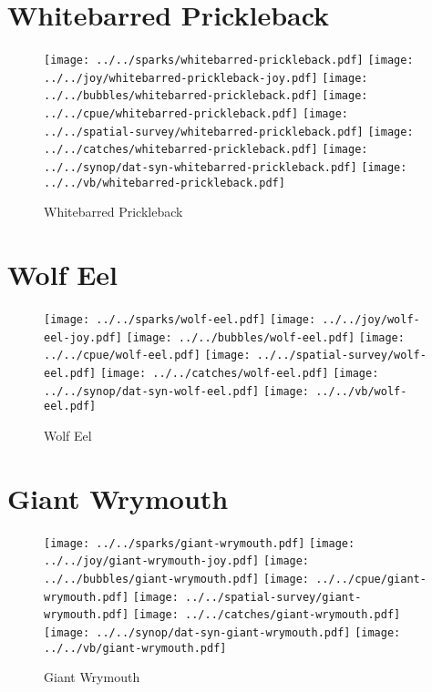 \section{Whitebarred Prickleback}

\begin{figure}[htbp]
\centering
\texttt{[image: ../../sparks/whitebarred-prickleback.pdf]}
\texttt{[image: ../../joy/whitebarred-prickleback-joy.pdf]}
\texttt{[image: ../../bubbles/whitebarred-prickleback.pdf]}
\texttt{[image: ../../cpue/whitebarred-prickleback.pdf]}
\texttt{[image: ../../spatial-survey/whitebarred-prickleback.pdf]}
\texttt{[image: ../../catches/whitebarred-prickleback.pdf]}
\texttt{[image: ../../synop/dat-syn-whitebarred-prickleback.pdf]}
\texttt{[image: ../../vb/whitebarred-prickleback.pdf]}
\caption{Whitebarred Prickleback}
\end{figure}
\clearpage
\section{Wolf Eel}

\begin{figure}[htbp]
\centering
\texttt{[image: ../../sparks/wolf-eel.pdf]}
\texttt{[image: ../../joy/wolf-eel-joy.pdf]}
\texttt{[image: ../../bubbles/wolf-eel.pdf]}
\texttt{[image: ../../cpue/wolf-eel.pdf]}
\texttt{[image: ../../spatial-survey/wolf-eel.pdf]}
\texttt{[image: ../../catches/wolf-eel.pdf]}
\texttt{[image: ../../synop/dat-syn-wolf-eel.pdf]}
\texttt{[image: ../../vb/wolf-eel.pdf]}
\caption{Wolf Eel}
\end{figure}
\clearpage
\section{Giant Wrymouth}

\begin{figure}[htbp]
\centering
\texttt{[image: ../../sparks/giant-wrymouth.pdf]}
\texttt{[image: ../../joy/giant-wrymouth-joy.pdf]}
\texttt{[image: ../../bubbles/giant-wrymouth.pdf]}
\texttt{[image: ../../cpue/giant-wrymouth.pdf]}
\texttt{[image: ../../spatial-survey/giant-wrymouth.pdf]}
\texttt{[image: ../../catches/giant-wrymouth.pdf]}
\texttt{[image: ../../synop/dat-syn-giant-wrymouth.pdf]}
\texttt{[image: ../../vb/giant-wrymouth.pdf]}
\caption{Giant Wrymouth}
\end{figure}
\clearpage
